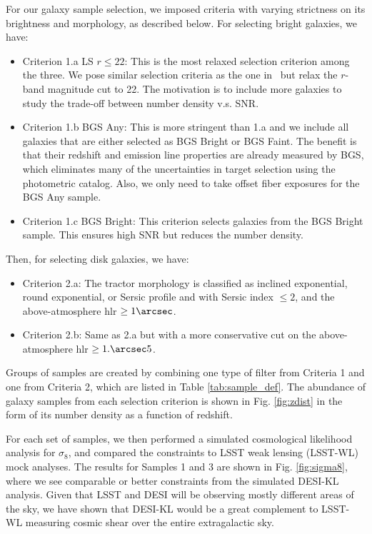 For our galaxy sample selection, we imposed criteria with varying strictness on its brightness and morphology, as described below. For selecting bright galaxies, we have:
\begin{itemize}
    \item Criterion 1.a LS $r\leq22$: This is the most relaxed selection criterion among the three. We pose similar selection criteria as the one in~\citep{BGS_selection2} but relax the $r$-band magnitude cut to 22. The motivation is to include more galaxies to study the trade-off between number density v.s. SNR.  
    \item Criterion 1.b BGS Any: This is more stringent than 1.a and we include all galaxies that are either selected as BGS Bright or BGS Faint. The benefit is that their redshift and emission line properties are already measured by BGS, which eliminates many of the uncertainties in target selection using the photometric catalog. Also, we only need to take offset fiber exposures for the BGS Any sample. 
    \item Criterion 1.c BGS Bright: This criterion selects galaxies from the BGS Bright sample. This ensures high SNR but reduces the number density.
\end{itemize}
Then, for selecting disk galaxies, we have:
\begin{itemize}
    \item Criterion 2.a: The tractor morphology is classified as inclined exponential, round exponential, or Sersic profile and with Sersic index $\leq 2$, and the above-atmosphere hlr $\geq 1\arcsec$.
    \item Criterion 2.b: Same as 2.a but with a more conservative cut on the above-atmosphere hlr $\geq 1.\arcsec5$.
\end{itemize}
Groups of samples are created by combining one type of filter from Criteria 1 and one from Criteria 2, which are listed in Table \ref{tab:sample_def}. The abundance of galaxy samples from each selection criterion is shown in Fig. \ref{fig:zdist} in the form of its number density as a function of redshift.

For each set of samples, we then performed a simulated cosmological likelihood analysis for $\sigma_8$, and compared the constraints to LSST weak lensing (LSST-WL) mock analyses. The results for Samples 1 and 3 are shown in Fig. \ref{fig:sigma8}, where we see comparable or better constraints from the simulated DESI-KL analysis. Given that LSST and DESI will be observing mostly different areas of the sky, we have shown that DESI-KL would be a great complement to LSST-WL measuring cosmic shear over the entire extragalactic sky.

